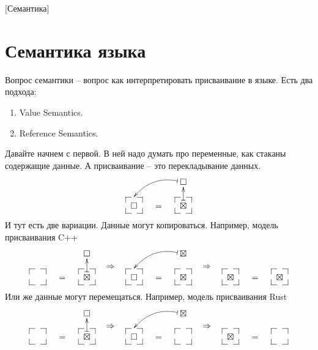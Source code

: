 [Семантика]


\section{Семантика языка}
\label{section::Semantics}

Вопрос семантики -- вопрос как интерпретировать присваивание в языке.
Есть два подхода:
\begin{enumerate}
\item Value Semantics.
\item Reference Semantics.
\end{enumerate}
Давайте начнем с первой.
В ней надо думать про переменные, как стаканы содержащие данные.
А присваивание -- это перекладывание данных.
\[
\xymatrix@R=15pt@C=15pt{
{}&{}&{\square}\ar@{|->}@/_10pt/[lld]+(0,4)\\
{\square}
{\save
[].[]*+[F--]\frm{}
\restore}
&{=}&{\boxtimes}\ar@{|->}[u]
{\save
[].[]*+[F--]\frm{}
\restore}
}
\]
И тут есть две вариации.
Данные могут копироваться.
Например, модель присваивания C++
\[
\begin{aligned}
\xymatrix@R=15pt@C=15pt{
{}&{}&{\square}\\
{\phantom{\boxtimes}}
{\save
[].[]*+[F--]\frm{}
\restore}
&{=}&{\boxtimes}\ar@{|->}[u]
{\save
[].[]*+[F--]\frm{}
\restore}
}
\end{aligned}
\quad\Rightarrow\quad
\begin{aligned}
\xymatrix@R=15pt@C=15pt{
{}&{}&{\boxtimes}\ar@{|->}@/_10pt/[lld]+(0,4)\\
{\square}
{\save
[].[]*+[F--]\frm{}
\restore}
&{=}&{\boxtimes}
{\save
[].[]*+[F--]\frm{}
\restore}
}
\end{aligned}
\quad\Rightarrow\quad
\begin{aligned}
\xymatrix@R=15pt@C=15pt{
{}&{}&{\phantom{\boxtimes}}\\
{\boxtimes}
{\save
[].[]*+[F--]\frm{}
\restore}
&{=}&{\boxtimes}
{\save
[].[]*+[F--]\frm{}
\restore}
}
\end{aligned}
\]
Или же данные могут перемещаться.
Например, модель присваивания Rust
\[
\begin{aligned}
\xymatrix@R=15pt@C=15pt{
{}&{}&{\square}\\
{\phantom{\boxtimes}}
{\save
[].[]*+[F--]\frm{}
\restore}
&{=}&{\boxtimes}\ar@{|->}[u]
{\save
[].[]*+[F--]\frm{}
\restore}
}
\end{aligned}
\quad\Rightarrow\quad
\begin{aligned}
\xymatrix@R=15pt@C=15pt{
{}&{}&{\boxtimes}\ar@{|->}@/_10pt/[lld]+(0,4)\\
{\square}
{\save
[].[]*+[F--]\frm{}
\restore}
&{=}&{\phantom{\boxtimes}}
{\save
[].[]*+[F--]\frm{}
\restore}
}
\end{aligned}
\quad\Rightarrow\quad
\begin{aligned}
\xymatrix@R=15pt@C=15pt{
{}&{}&{\phantom{\boxtimes}}\\
{\boxtimes}
{\save
[].[]*+[F--]\frm{}
\restore}
&{=}&{\phantom{\boxtimes}}
{\save
[].[]*+[F--]\frm{}
\restore}
}
\end{aligned}
\]
